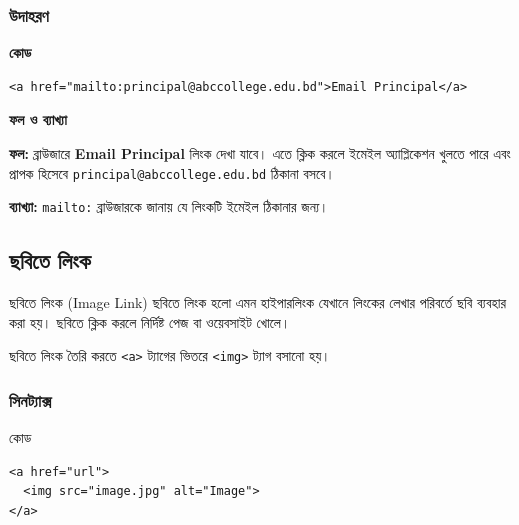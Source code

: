 \subsubsection{উদাহরণ}

\par\noindent
\begin{minipage}[t]{.54\linewidth}\vspace{0pt}\small
\textbf{\color{chFourTeal}কোড}\par
\begin{verbatim}
<a href="mailto:principal@abccollege.edu.bd">Email Principal</a>
\end{verbatim}

\par\smallskip
\end{minipage}\hfill
\begin{minipage}[t]{.42\linewidth}\vspace{0pt}\small
\textbf{\color{chFourTeal}ফল ও ব্যাখ্যা}\par
\textbf{ফল:} ব্রাউজারে \textbf{Email Principal} লিংক দেখা যাবে। এতে ক্লিক করলে ইমেইল অ্যাপ্লিকেশন খুলতে পারে এবং প্রাপক হিসেবে \texttt{principal@abccollege.edu.bd} ঠিকানা বসবে।

\textbf{ব্যাখ্যা:} \texttt{mailto:} ব্রাউজারকে জানায় যে লিংকটি ইমেইল ঠিকানার জন্য।
\par\smallskip
\end{minipage}\par




\subsection{ছবিতে লিংক}

\begin{definitionbox}{ছবিতে লিংক (Image Link)}
ছবিতে লিংক হলো এমন হাইপারলিংক যেখানে লিংকের লেখার পরিবর্তে ছবি ব্যবহার করা হয়। ছবিতে ক্লিক করলে নির্দিষ্ট পেজ বা ওয়েবসাইট খোলে।
\end{definitionbox}

ছবিতে লিংক তৈরি করতে \texttt{<a>} ট্যাগের ভিতরে \texttt{<img>} ট্যাগ বসানো হয়।

\subsubsection{সিনট্যাক্স}

\begin{examplebox}{কোড}
\par\noindent\begin{minipage}{\linewidth}
\begin{verbatim}
<a href="url">
  <img src="image.jpg" alt="Image">
</a>
\end{verbatim}
\end{minipage}\par
\end{examplebox}

